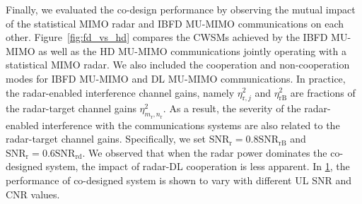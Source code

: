 \documentclass[9pt,journal]{IEEEtran}
\newcommand{\paren}[1]{\left({#1}\right)}
\newcommand{\rr}{_\mathrm{r}}
\theoremstyle{definition}
\begin{document}
{\begin{figure}[t]
\label{fig:joint}
\vspace{-1em}
\end{figure}

Finally, we evaluated the co-design performance by observing the mutual impact of the statistical MIMO radar and IBFD MU-MIMO communications on each other. Figure~\ref{fig:fd_vs_hd} compares the CWSMs achieved by the IBFD MU-MIMO as well as the HD MU-MIMO communications jointly operating with a statistical MIMO radar. We also included the cooperation and non-cooperation modes for IBFD MU-MIMO and DL MU-MIMO communications. In practice, the radar-enabled interference channel gains, namely $\eta^2_{\mathrm{r},j}$ and $\eta^2_{\mathrm{rB}}$ are fractions of the radar-target channel gains $\eta^2_{m\rr,n\rr}$. As a result, the severity of the radar-enabled interference with the communications systems are also related to the radar-target channel gains. Specifically, we set $\mathrm{SNR}_{\textrm{r}}=0.8\mathrm{SNR}_{\textrm{rB}}$ and $\mathrm{SNR}_{\textrm{r}}=0.6\mathrm{SNR}_{\textrm{rd}}$. We observed that when the radar power dominates the co-designed system, the impact of radar-DL cooperation is less apparent. In \figurename{\;\ref{fig:joint}}, the performance of co-designed system is shown to vary with different UL SNR and CNR values.  %
}
\end{document}
